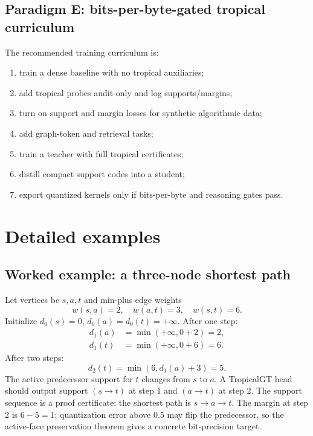 \documentclass[11pt]{article}
\begin{document}
\subsection{Paradigm E: bits-per-byte-gated tropical curriculum}

The recommended training curriculum is:
\begin{enumerate}
\item train a dense baseline with no tropical auxiliaries;
\item add tropical probes audit-only and log supports/margins;
\item turn on support and margin losses for synthetic algorithmic data;
\item add graph-token and retrieval tasks;
\item train a teacher with full tropical certificates;
\item distill compact support codes into a student;
\item export quantized kernels only if bits-per-byte and reasoning gates pass.
\end{enumerate}

\section{Detailed examples}

\subsection{Worked example: a three-node shortest path}

Let vertices be \(s,a,t\) and min-plus edge weights
\begin{equation}
w(s,a)=2,\quad w(a,t)=3,\quad w(s,t)=6.
\end{equation}
Initialize \(d_0(s)=0\), \(d_0(a)=d_0(t)=+\infty\).  After one step:
\begin{align}
d_1(a)&=\min(+\infty,0+2)=2,\\
d_1(t)&=\min(+\infty,0+6)=6.
\end{align}
After two steps:
\begin{equation}
d_2(t)=\min(6,d_1(a)+3)=5.
\end{equation}
The active predecessor support for \(t\) changes from \(s\) to \(a\).  A TropicalGT head should output support \((s\to t)\) at step 1 and \((a\to t)\) at step 2.  The support sequence is a proof certificate: the shortest path is \(s\to a\to t\).  The margin at step 2 is \(6-5=1\); quantization error above \(0.5\) may flip the predecessor, so the active-face preservation theorem gives a concrete bit-precision target.
\end{document}
